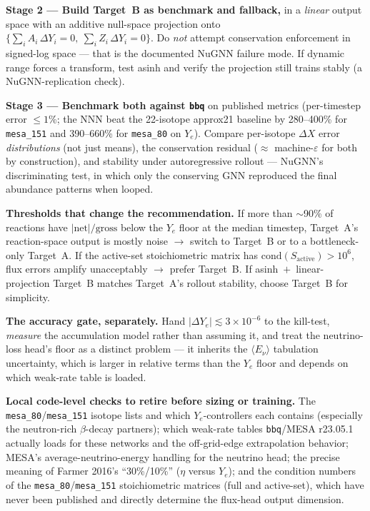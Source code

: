 \documentclass[11pt]{article}
\begin{document}
\smallskip
\noindent\textbf{Stage 2 --- Build Target~B as benchmark and fallback,} in a \emph{linear} output space with an additive null-space projection onto $\{\sum_i A_i\,\Delta Y_i = 0,\ \sum_i Z_i\,\Delta Y_i = 0\}$. Do \emph{not} attempt conservation enforcement in signed-log space --- that is the documented NuGNN failure mode. If dynamic range forces a transform, test asinh and verify the projection still trains stably (a NuGNN-replication check).

\smallskip
\noindent\textbf{Stage 3 --- Benchmark both against \texttt{bbq}} on published metrics (per-timestep error $\le 1$\%; the NNN beat the 22-isotope approx21 baseline by 280--400\% for \texttt{mesa\_151} and 390--660\% for \texttt{mesa\_80} on $Y_e$). Compare per-isotope $\Delta X$ error \emph{distributions} (not just means), the conservation residual ($\approx$ machine-$\varepsilon$ for both by construction), and stability under autoregressive rollout --- NuGNN's discriminating test, in which only the conserving GNN reproduced the final abundance patterns when looped.

\smallskip
\noindent\textbf{Thresholds that change the recommendation.} If more than $\sim$90\% of reactions have $|\text{net}|/\text{gross}$ below the $Y_e$ floor at the median timestep, Target~A's reaction-space output is mostly noise $\to$ switch to Target~B or to a bottleneck-only Target~A. If the active-set stoichiometric matrix has $\mathrm{cond}(S_{\text{active}}) > 10^6$, flux errors amplify unacceptably $\to$ prefer Target~B. If asinh~$+$~linear-projection Target~B matches Target~A's rollout stability, choose Target~B for simplicity.

\smallskip
\noindent\textbf{The accuracy gate, separately.} Hand $|\Delta Y_e| \lesssim 3\times10^{-6}$ to the kill-test, \emph{measure} the accumulation model rather than assuming it, and treat the neutrino-loss head's floor as a distinct problem --- it inherits the $\langle E_\nu\rangle$ tabulation uncertainty, which is larger in relative terms than the $Y_e$ floor and depends on which weak-rate table is loaded.

\smallskip
\noindent\textbf{Local code-level checks to retire before sizing or training.} The \texttt{mesa\_80}/\texttt{mesa\_151} isotope lists and which $Y_e$-controllers each contains (especially the neutron-rich $\beta$-decay partners); which weak-rate tables \texttt{bbq}/MESA r23.05.1 actually loads for these networks and the off-grid-edge extrapolation behavior; MESA's average-neutrino-energy handling for the neutrino head; the precise meaning of Farmer 2016's ``30\%/10\%'' ($\eta$ versus $Y_e$); and the condition numbers of the \texttt{mesa\_80}/\texttt{mesa\_151} stoichiometric matrices (full and active-set), which have never been published and directly determine the flux-head output dimension.
\end{document}
